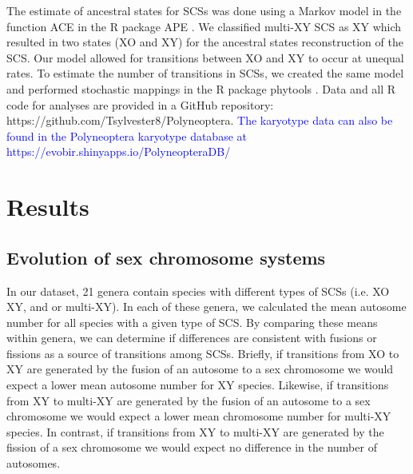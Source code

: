 \documentclass[]{rsos}%
\begin{document}
The estimate of ancestral states for SCSs was done using a Markov model in the function ACE in the R package APE \cite{Paradis2018}.
We classified multi-XY SCS as XY which resulted in two states (XO and XY) for the ancestral states reconstruction of the SCS. 
Our model allowed for transitions between XO and XY to occur at unequal rates.
To estimate the number of transitions in SCSs, we created the same model and performed stochastic mappings in the R package phytools \cite{revell2012phytools}.
Data and all R code for analyses are provided in a GitHub repository: https://github.com/Tsylvester8/Polyneoptera. 
\textcolor{blue}{The karyotype data can also be found in the Polyneoptera karyotype database at https://evobir.shinyapps.io/PolyneopteraDB/}

\section{Results}

\subsection{Evolution of sex chromosome systems}
In our dataset, 21 genera contain species with different types of SCSs (i.e. XO XY, and or multi-XY).
In each of these genera, we calculated the mean autosome number for all species with a given type of SCS.
By comparing these means within genera, we can determine if differences are consistent with fusions or fissions as a source of transitions among SCSs.
Briefly, if transitions from XO to XY are generated by the fusion of an autosome to a sex chromosome we would expect a lower mean autosome number for XY species.
Likewise, if transitions from XY to multi-XY are generated by the fusion of an autosome to a sex chromosome we would expect a lower mean chromosome number for multi-XY species.
In contrast, if transitions from XY to multi-XY are generated by the fission of a sex chromosome we would expect no difference in the number of autosomes.
\end{document}
